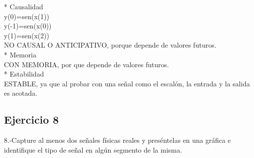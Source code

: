\documentclass[10pt,a4paper]{report}
\begin{document}
\begin{itemize}
* Causalidad\\

y(0)=sen(x(1))\\
y(-1)=sen(x(0))\\
y(1)=sen(x(2))\\

NO CAUSAL O ANTICIPATIVO, porque depende de valores futuros. \\

* Memoria\\

CON MEMORIA, por que depende de valores futuros.\\

* Estabilidad\\
ESTABLE, ya que al probar con una señal como el escalón, la entrada y la salida es acotada.\\

\end{itemize}

\subsection{Ejercicio 8}
8.-Capture al menos dos señales físicas reales y preséntelas en una  gráfica e identifique el tipo de señal en algún segmento de la misma.\\
\end{document}
